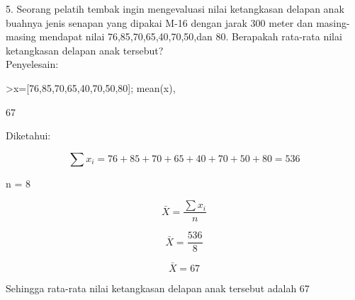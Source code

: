 \documentclass[12pt,arial,letterpaper]{book}
\begin{document}
\begin{eulernootebook}
\begin{eulercomment}
\begin{eulercomment}
\begin{eulernootebook}
\begin{eulercomment}
\begin{eulercomment}
\begin{eulercomment}
\begin{eulercomment}
\begin{eulercomment}
\begin{eulercomment}
\begin{eulercomment}
\begin{eulercomment}
\begin{eulercomment}
\begin{eulercomment}
\begin{eulercomment}
\begin{eulercomment}
\begin{eulercomment}
\begin{eulercomment}
5. Seorang pelatih tembak ingin mengevaluasi nilai ketangkasan delapan
anak buahnya jenis senapan yang dipakai M-16 dengan jarak 300 meter
dan masing-masing mendapat nilai 76,85,70,65,40,70,50,dan 80.
Berapakah rata-rata nilai ketangkasan delapan anak tersebut?\\
Penyelesain:
\end{eulercomment}
\begin{eulerprompt}
>x=[76,85,70,65,40,70,50,80]; mean(x),
\end{eulerprompt}
\begin{euleroutput}
  67
\end{euleroutput}
\begin{eulercomment}
Diketahui:\\
\end{eulercomment}
\begin{eulerformula}
\[
\sum x_i={76+85+70+65+40+70+50+80}=536
\]
\end{eulerformula}
\begin{eulerttcomment}
                 n = 8
\end{eulerttcomment}
\begin{eulerformula}
\[
\bar{X} = \frac{\sum x_i}{n}
\]
\end{eulerformula}
\begin{eulerformula}
\[
\bar{X} = \frac{536}{8}
\]
\end{eulerformula}
\begin{eulerformula}
\[
\bar{X} = 67
\]
\end{eulerformula}
\begin{eulercomment}
Sehingga rata-rata nilai ketangkasan delapan anak tersebut adalah 67


\end{eulercomment}
\end{eulercomment}
\end{eulercomment}
\end{eulercomment}
\end{eulercomment}
\end{eulercomment}
\end{eulercomment}
\end{eulercomment}
\end{eulercomment}
\end{eulercomment}
\end{eulercomment}
\end{eulercomment}
\end{eulercomment}
\end{eulercomment}
\end{eulernootebook}
\end{eulercomment}
\end{eulercomment}
\end{eulernootebook}
\end{document}
